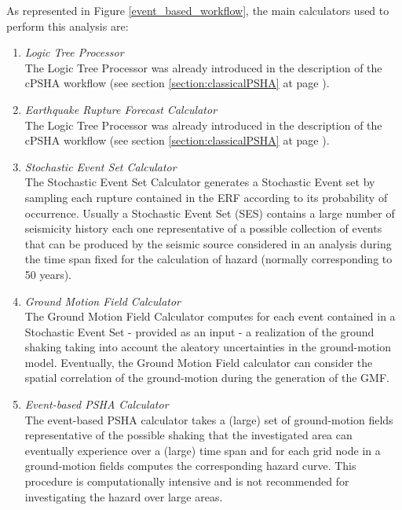 As represented in Figure \ref{event_based_workflow}, the main calculators 
used to perform this analysis are:
\begin{enumerate}
%
\item \emph{Logic Tree Processor} \hfill \\
The Logic Tree Processor was already 
introduced in the description of the cPSHA workflow (see section 
\ref{section:classicalPSHA} at page \pageref{section:classicalPSHA}).
%
\item \emph{Earthquake Rupture Forecast Calculator} \hfill \\ 
The Logic Tree Processor was already 
introduced in the description of the cPSHA workflow (see section 
\ref{section:classicalPSHA} at page \pageref{section:classicalPSHA}).
%
\item \emph{Stochastic Event Set Calculator} \hfill \\
The Stochastic Event Set Calculator generates a Stochastic Event set 
by sampling each rupture contained in the ERF according to its 
probability of occurrence. Usually a Stochastic Event Set (SES) contains
a large number of seismicity history each one representative of a  
possible collection of events that can be produced by the seismic source
considered in an analysis during the time span fixed for the calculation
of hazard (normally corresponding to 50 years).
%
\item \emph{Ground Motion Field Calculator} \hfill \\
The Ground Motion Field Calculator computes for each event contained in a 
Stochastic Event Set - provided as an input - a realization of the 
ground shaking taking into account the aleatory uncertainties in 
the ground-motion model. Eventually, the Ground Motion Field calculator 
can consider the spatial correlation of the ground-motion during the 
generation of the GMF.
%
\item \emph{Event-based PSHA Calculator} \hfill \\
The event-based PSHA calculator takes a (large) set of ground-motion 
fields representative of the possible shaking that the investigated 
area can eventually experience over a (large) time span and for each 
grid node in a ground-motion fields computes the corresponding hazard 
curve. 
%
This procedure is computationally intensive and is not recommended for 
investigating the hazard over large areas. 
\end{enumerate}

